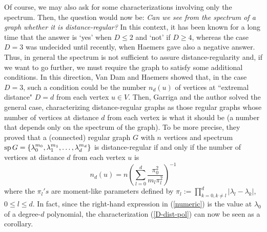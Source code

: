 \documentclass[11pt]{article}
\def\sp{\mathop{\rm sp}\nolimits}
\begin{document}
Of course, we may also ask for some characterizations involving
only the spectrum. Then, the question would now be: {\it Can we see
from the spectrum of a graph  whether it is distance-regular?}  In
this context, it  has been known for a long time that the answer  is
`yes' when $D\le 2$ and `not' if $D\ge 4$, whereas the case $D=3$
was  undecided until recently, when Haemers \cite{ha96} gave also a
negative answer.  Thus,  in general the spectrum is not sufficient to
assure distance-regularity and, if we  want to go further,  we must
require the graph to satisfy some additional conditions. In this
direction, Van Dam and Haemers 
\cite{vdh96} showed that, in the case $D=3$, such a condition could
be the number $n_d(u)$ of vertices at ``extremal distance" $D=d$
from each vertex $u\in V$. Then,  Garriga and the author
\cite{fg97} solved the general case, characterizing distance-regular
graphs as those regular graphs whose number of vertices at distance
$d$ from each vertex is what it should be (a number that depends
only on the spectrum of the graph).  
To be more precise, they proved that a (connected) regular graph $G$
with $n$ vertices and spectrum 
$\sp G =\{\lambda_0^{m_0},\lambda_1^{m_1},\dots,
\lambda_d^{m_d}\}$ is distance-regular if and only if  the 
number of  vertices at distance $d$ from each vertex $u$ is
\begin{equation}
\label{numeric}
n_{d}(u)
=n\left(\sum_{l=0}^{d}\frac{\pi_0^2}{m_l\pi_l^2}\right)^{-1}
\end{equation}
where the $\pi_l's$ are moment-like parameters defined by
$\pi_l :=\prod_{k=0,k\neq l}^{d} |\lambda_l-\lambda_k|$, $0\le l\le
d$. In fact, since the  right-hand expression in (\ref{numeric}) is the
value at $\lambda_0$ of a degree-$d$ polynomial,
the characterization (\ref{D-dist-pol}) can now be seen as a
corollary.
\end{document}
